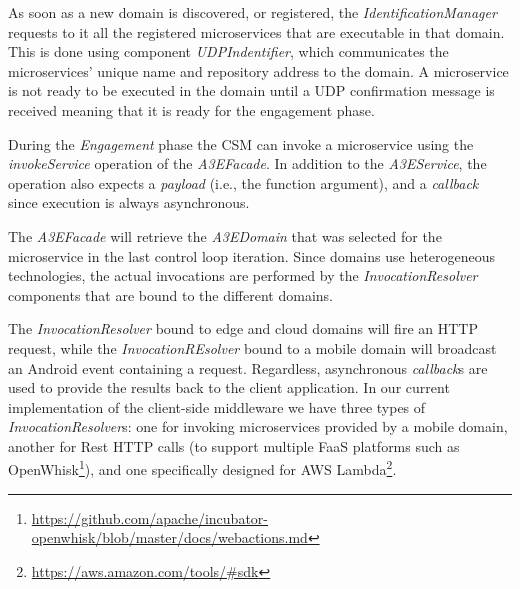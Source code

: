 
As soon as a new domain is discovered, or registered, the \textit{IdentificationManager} requests to it all the registered microservices that are executable in that domain. This is done using component \textit{UDPIndentifier}, which communicates the microservices' unique name and repository address to the domain. A microservice is not ready to be executed in the domain until a UDP confirmation message is received meaning that it is ready for the engagement phase. 

During the \textit{Engagement} phase the CSM can invoke a microservice using the \textit{invokeService} operation of the \textit{A3EFacade}. In addition to the \textit{A3EService}, the operation also expects a \textit{payload} (i.e., the function argument), and a \textit{callback} since  execution is always asynchronous. 

The \textit{A3EFacade} will retrieve the \textit{A3EDomain} that was selected for the microservice in the last control loop iteration. Since domains use heterogeneous technologies, the actual invocations are performed by the \textit{InvocationResolver} components that are bound to the different domains. 

The \textit{InvocationResolver} bound to edge and cloud domains will fire an HTTP request, while the \textit{InvocationREsolver} bound to a mobile domain will broadcast an Android event containing a request. Regardless, asynchronous \textit{callback}s are used to provide the results back to the client application. %
In our current implementation of the client-side middleware we have three types of \textit{InvocationResolver}s: one for invoking microservices provided by a mobile domain, another for Rest HTTP calls (to support multiple FaaS platforms such as OpenWhisk\footnote{\url{https://github.com/apache/incubator-openwhisk/blob/master/docs/webactions.md}}), and one specifically designed for AWS Lambda\footnote{\url{https://aws.amazon.com/tools/\#sdk}}. %


